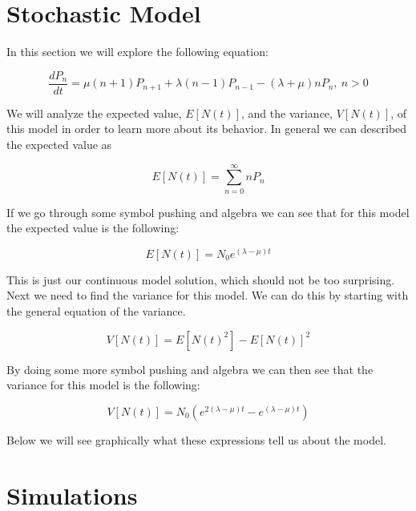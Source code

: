 \documentclass[11pt, oneside]{article}   	%
\begin{document}

\section{Stochastic Model}

In this section we will explore the following equation:

$$\frac{dP_n}{dt} = \mu (n+1)P_{n+1}+\lambda (n-1)P_{n-1}-(\lambda+\mu)nP_n, \ n>0$$

We will analyze the expected value, $E[N(t)]$, and the variance, $V[N(t)]$, of this model in order to learn more about its behavior.
In general we can described the expected value as

$$E[N(t)] = \sum_{n=0}^\infty n P_n$$

If we go through some symbol pushing and algebra we can see that for this model the expected value is the following:

 $$E[N(t)] = N_0 e^{(\lambda-\mu)t}$$

 This is just our continuous model solution, which should not be too surprising.
 Next we need to find the variance for this model.
 We can do this by starting with the general equation of the variance.

 $$V[N(t)] = E[N(t)^2]-E[N(t)]^2$$

 By doing some more symbol pushing and algebra we can then see that the variance for this model is the following:

 $$V[N(t)] = N_0\left(e^{2(\lambda-\mu)t} - e^{(\lambda-\mu)t}\right)$$

 Below we will see graphically what these expressions tell us about the model.


 \section{Simulations}
\end{document}
